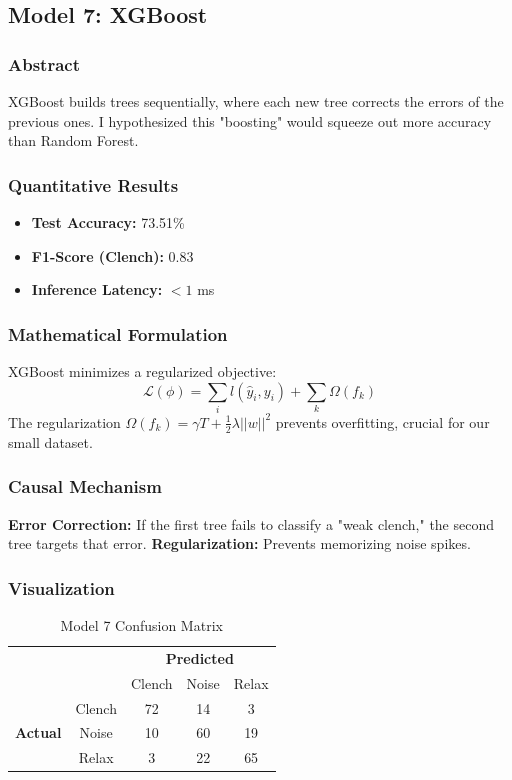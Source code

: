 \documentclass{article}
\begin{document}
\clearpage
\subsection{Model 7: XGBoost}
\subsubsection{Abstract}
XGBoost \cite{xgboost} builds trees sequentially, where each new tree corrects the errors of the previous ones. I hypothesized this "boosting" would squeeze out more accuracy than Random Forest.

\subsubsection{Quantitative Results}
\begin{itemize}
    \item \textbf{Test Accuracy:} 73.51\%
    \item \textbf{F1-Score (Clench):} 0.83
    \item \textbf{Inference Latency:} $< 1$ ms
\end{itemize}

\subsubsection{Mathematical Formulation}
XGBoost minimizes a regularized objective:
\begin{equation}
    \mathcal{L}(\phi) = \sum_{i} l(\hat{y}_i, y_i) + \sum_{k} \Omega(f_k)
\end{equation}
The regularization $\Omega(f_k) = \gamma T + \frac{1}{2}\lambda ||w||^2$ prevents overfitting, crucial for our small dataset.

\subsubsection{Causal Mechanism}
\textbf{Error Correction:} If the first tree fails to classify a "weak clench," the second tree targets that error.
\textbf{Regularization:} Prevents memorizing noise spikes.

\subsubsection{Visualization}
    \begin{table}[h]
        \centering
        \begin{tabular}{cc|ccc}
            & & \multicolumn{3}{c}{\textbf{Predicted}} \\
            & & Clench & Noise & Relax \\
            \hline
            \multirow{3}{*}{\textbf{Actual}} & Clench & 72 & 14 & 3 \\
            & Noise & 10 & 60 & 19 \\
            & Relax & 3 & 22 & 65 \\
        \end{tabular}
        \caption{Model 7 Confusion Matrix}
    \end{table}
\end{document}
